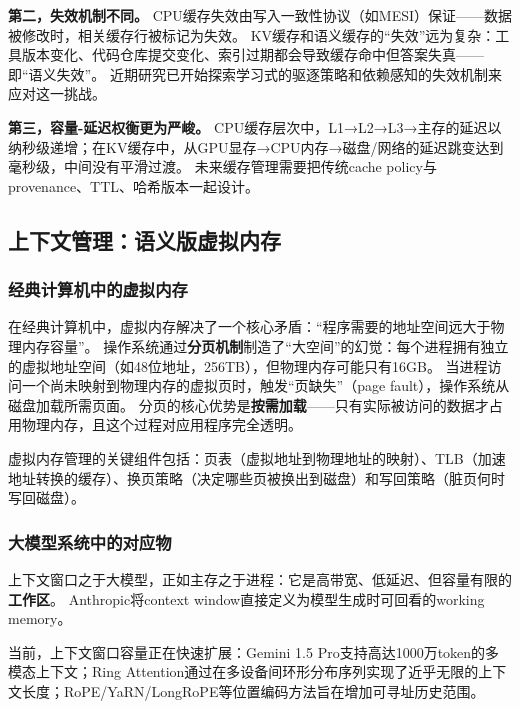 \textbf{第二，失效机制不同。}
CPU缓存失效由写入一致性协议（如MESI）保证——数据被修改时，相关缓存行被标记为失效。
KV缓存和语义缓存的``失效''远为复杂：工具版本变化、代码仓库提交变化、索引过期都会导致缓存命中但答案失真——即``语义失效''。
近期研究已开始探索学习式的驱逐策略\cite{lpc2025}和依赖感知的失效机制\cite{multilevelcache2025}来应对这一挑战。

\textbf{第三，容量-延迟权衡更为严峻。}
CPU缓存层次中，L1→L2→L3→主存的延迟以纳秒级递增；在KV缓存中，从GPU显存→CPU内存→磁盘/网络的延迟跳变达到毫秒级，中间没有平滑过渡。
未来缓存管理需要把传统cache policy与provenance、TTL、哈希版本一起设计。

\subsection{上下文管理：语义版虚拟内存}
\label{sec:memory}

\subsubsection{经典计算机中的虚拟内存}

在经典计算机中，虚拟内存解决了一个核心矛盾：``程序需要的地址空间远大于物理内存容量''。
操作系统通过\textbf{分页机制}制造了``大空间''的幻觉：每个进程拥有独立的虚拟地址空间（如48位地址，256TB），但物理内存可能只有16GB。
当进程访问一个尚未映射到物理内存的虚拟页时，触发``页缺失''（page fault），操作系统从磁盘加载所需页面。
分页的核心优势是\textbf{按需加载}——只有实际被访问的数据才占用物理内存，且这个过程对应用程序完全透明。

虚拟内存管理的关键组件包括：页表（虚拟地址到物理地址的映射）、TLB（加速地址转换的缓存）、换页策略（决定哪些页被换出到磁盘）和写回策略（脏页何时写回磁盘）\cite{ostep_2023}。

\subsubsection{大模型系统中的对应物}

上下文窗口之于大模型，正如主存之于进程：它是高带宽、低延迟、但容量有限的\textbf{工作区}。
Anthropic将context window直接定义为模型生成时可回看的working memory。

当前，上下文窗口容量正在快速扩展：Gemini 1.5 Pro支持高达1000万token的多模态上下文\cite{gemini2024}；Ring Attention通过在多设备间环形分布序列实现了近乎无限的上下文长度\cite{liu2024ringattention}；RoPE/YaRN/LongRoPE等位置编码方法旨在增加可寻址历史范围\cite{su2021roformer,yarn2024,longrope2024}。

